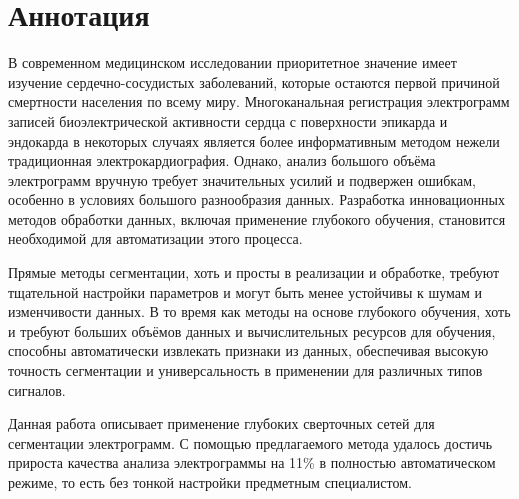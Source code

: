 \section*{Аннотация}

В современном медицинском исследовании приоритетное значение имеет изучение
сердечно-сосудистых заболеваний, которые остаются первой причиной
смертности населения по всему миру. Многоканальная регистрация электрограмм
записей биоэлектрической активности сердца с поверхности эпикарда и эндокарда в
некоторых случаях является более информативным методом нежели традиционная
электрокардиография. Однако, анализ большого объёма электрограмм вручную
требует значительных усилий и подвержен ошибкам, особенно в условиях большого
разнообразия данных. Разработка инновационных методов обработки данных, включая
применение глубокого обучения, становится необходимой для автоматизации этого
процесса.

Прямые методы сегментации, хоть и просты в реализации и обработке, требуют
тщательной настройки параметров и могут быть менее устойчивы к шумам и
изменчивости данных. В то время как методы на основе глубокого обучения, хоть и
требуют больших объёмов данных и вычислительных ресурсов для обучения, способны
автоматически извлекать признаки из данных, обеспечивая высокую точность
сегментации и универсальность в применении для различных типов сигналов.

Данная работа описывает применение глубоких сверточных сетей для сегментации
электрограмм. С помощью предлагаемого метода удалось достичь прироста качества
анализа электрограммы на 11\% в полностью автоматическом режиме, то есть без
тонкой настройки предметным специалистом.
